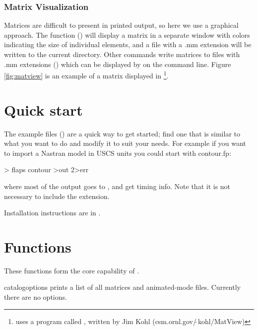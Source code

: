 \subsubsection{Matrix Visualization}\label{ref:matrix-display}
Matrices are difficult to present in printed output, so here we use
a graphical approach. The  function ()
will display a matrix in a separate window with colors indicating
the size of individual elements, and a file with a .mm extension
will be written to the current directory. Other \Flaps commands write
matrices to files with .mm extensions (\cite{matrixmarket})
which can be displayed by  on the command line.
Figure \ref{fig:matview} is an example of a matrix
displayed in \footnote{ uses a program called , written by Jim Kohl (csm.ornl.gov/$\tilde{\ }$kohl/MatView)}.


\section{Quick start}
The example files () are a quick way to get
started; find one that is similar to what you want to do and modify
it to suit your needs. For example if you want to import a Nastran
model in USCS units you could start with contour.fp:
\begin{example}
> flaps contour >out 2>err
\end{example}
where most of the output goes to , and  get timing info.
Note that it is not necessary to include the extension.

Installation instructions are in .

\section{Functions}
These functions form the core capability of \flaps.


\begin{cmdref}{catalog}{options}
{prints a list of all matrices and animated-mode files.
Currently there are no options.}
\end{cmdref}

